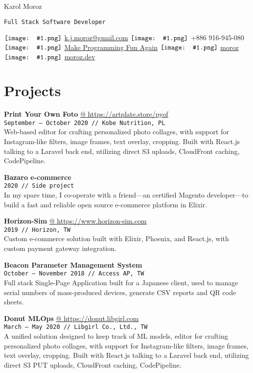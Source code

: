 \documentclass[10pt,a4paper]{article}
\author{Karol Moroz}
\makeatletter
\newcommand{\icon}[1]{$\vcenter{\hbox{\texttt{[image: \#1.png]}}}$\hspace{.2em}}
\newcommand{\project}[3]{\par\vspace{1em}\textbf{\normalsize #1}\\[1pt]{\small\texttt{#2 // #3}}\\[4pt]}
\newcommand{\projectweb}[4]{\par\vspace{1em}\textbf{\normalsize #1} \href{#2}{\color{darkgray} @ #2}\\[1pt]{\small\texttt{#3 // #4}}\\[4pt]}
\makeatother
\begin{document}
\pagestyle{empty}
{\TitleFont\color{titlecolor} Karol Moroz}

\texttt{Full Stack Software Developer}

\icon{email}
\href{mailto:k.j.moroz@gmail.com}{k.j.moroz@gmail.com} \hfill
\icon{telephone} +886 916-945-080 \hfill
\icon{youtube} \href{https://www.youtube.com/channel/UCW_YiVuoo-WG0bxQElVgxAg}{Make Programming Fun Again} \hfill
\icon{github} \href{https://github.com/moroz}{moroz} \hfill
\icon{web} \href{https://www.moroz.dev}{moroz.dev}

\begin{minipage}[t]{0.67\textwidth}
  \raggedright
  \section{Projects}

  \projectweb{Print Your Own Foto}{https://artplate.store/pyof}{September {–} October 2020}{Kobe Nutrition, PL}

  \small
  Web-based editor for crafting personalized photo collages, with support for Instagram-like filters, image frames, text overlay, cropping. Built with React.js talking to a Laravel back end, utilizing direct S3 uploads, CloudFront caching, CodePipeline.

  \project{Bazaro e-commerce}{2020}{Side project}

  \small
  In my spare time, I co-operate with a friend---an certified Magento developer---to build a fast and reliable open source e-commerce platform in Elixir.

  \projectweb{Horizon-Sim}{https://www.horizon-sim.com}{2019}{Horizon, TW}

  \small
  Custom e-commerce solution built with Elixir, Phoenix, and React.js, with custom payment gateway integration.

  \project{Beacon Parameter Management System}{October {–} November 2018}{Access AP, TW}

  \small
  Full stack Single-Page Application built for a Japanese client, used to manage serial numbers of mass-produced
  devices, generate CSV reports and QR code sheets.

  \projectweb{Donut MLOps}{https://donut.libgirl.com}{March {–} May 2020}{Libgirl Co., Ltd., TW}

  \small
  A unified solution designed to keep track of ML models, 
  editor for crafting personalized photo collages, with support for Instagram-like filters, image frames, text overlay, cropping. Built with React.js talking to a Laravel back end, utilizing direct S3 PUT uploads, CloudFront caching, CodePipeline.


\end{minipage}
\end{document}
